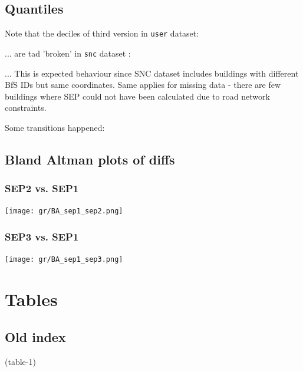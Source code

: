 \documentclass[a4paper, notitlepage, fleqn]{article} %
\begin{document}
\subsection{Quantiles}

Note that the deciles of third version in \texttt{user} dataset:
\begin{stlog}\end{stlog}
... are tad 'broken' in \texttt{snc} dataset :
\begin{stlog}\end{stlog}
... This is expected behaviour since SNC dataset includes buildings with different BfS IDs but same coordinates. 
Same applies for missing data - there are few buildings where SEP could not have been calculated due to road network constraints.  
\begin{landscape}
Some transitions happened:  
\begin{stlog}\end{stlog}
\end{landscape}

\subsection{Bland Altman plots of diffs}
\subsubsection{SEP2 vs. SEP1}

\begin{center}
\texttt{[image: gr/BA\_sep1\_sep2.png]} 
\end{center}

\subsubsection{SEP3 vs. SEP1}

\begin{center}
\texttt{[image: gr/BA\_sep1\_sep3.png]} 
\end{center}
\newpage
\section{Tables}
\newpage
\subsection{Old index}
\begin{landscape}
\begin{footnotesize}
(table-1)
\end{footnotesize}
\end{landscape}
\end{document}
